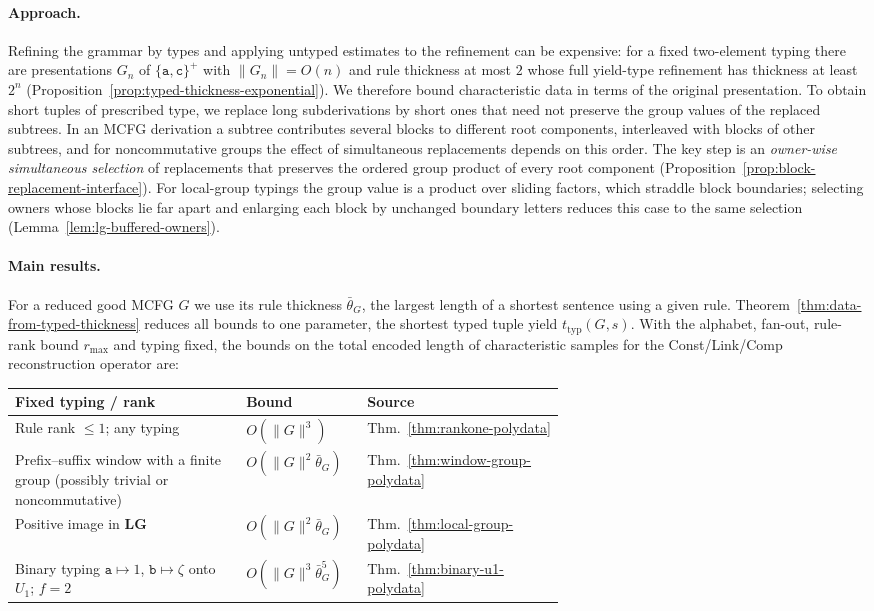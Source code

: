 \documentclass[11pt]{article}
\numberwithin{equation}{section}
\theoremstyle{plain}
\theoremstyle{definition}
\theoremstyle{remark}
\begin{document}
\paragraph{Approach.}
Refining the grammar by types and applying untyped estimates to the
refinement can be expensive: for a fixed two-element typing there are
presentations $G_n$ of $\{\mathtt a,\mathtt c\}^+$ with $\|G_n\|=O(n)$ and
rule thickness at most $2$ whose full yield-type refinement has thickness at
least $2^n$ (Proposition~\ref{prop:typed-thickness-exponential}).  We
therefore bound characteristic data in terms of the original presentation.
To obtain short tuples of prescribed type, we replace long subderivations
by short ones that need not preserve the group values of the replaced
subtrees.  In an MCFG derivation a subtree contributes several blocks to
different root components, interleaved with blocks of other subtrees, and
for noncommutative groups the effect of simultaneous replacements depends on
this order.  The key step is an \emph{owner-wise simultaneous selection} of
replacements that preserves the ordered group product of every root
component (Proposition~\ref{prop:block-replacement-interface}).  For
local-group typings the group value is a product over sliding factors, which
straddle block boundaries; selecting owners whose blocks lie far apart and
enlarging each block by unchanged boundary letters reduces this case to the
same selection (Lemma~\ref{lem:lg-buffered-owners}).

\paragraph{Main results.}
For a reduced good MCFG $G$ we use its rule thickness $\bar\theta_G$, the
largest length of a shortest sentence using a given rule.
Theorem~\ref{thm:data-from-typed-thickness} reduces all bounds to one
parameter, the shortest typed tuple yield $t_{\mathrm{typ}}(G,s)$.  With the
alphabet, fan-out, rule-rank bound $r_{\max}$ and typing fixed, the bounds on
the total encoded length of characteristic samples for the Const/Link/Comp
reconstruction operator are:

\begin{center}
\footnotesize
\setlength{\tabcolsep}{3pt}
\renewcommand{\arraystretch}{1.15}
\begin{tabularx}{\linewidth}{@{}p{0.42\linewidth}p{0.22\linewidth}X@{}}
\hline
Fixed typing / rank & Bound & Source\\
\hline
Rule rank $\le1$; any typing
 & $O(\|G\|^3)$ & Thm.~\ref{thm:rankone-polydata}\\
Prefix--suffix window with a finite group (possibly trivial or noncommutative)
 & $O(\|G\|^2\bar\theta_G)$ & Thm.~\ref{thm:window-group-polydata}\\
Positive image in $\mathbf{LG}$
 & $O(\|G\|^2\bar\theta_G)$ & Thm.~\ref{thm:local-group-polydata}\\
Binary typing $\mathtt a\mapsto1$, $\mathtt b\mapsto\zeta$ onto $U_1$; $f=2$
 & $O(\|G\|^3\bar\theta_G^5)$ & Thm.~\ref{thm:binary-u1-polydata}\\
\hline
\end{tabularx}
\end{center}
\end{document}
